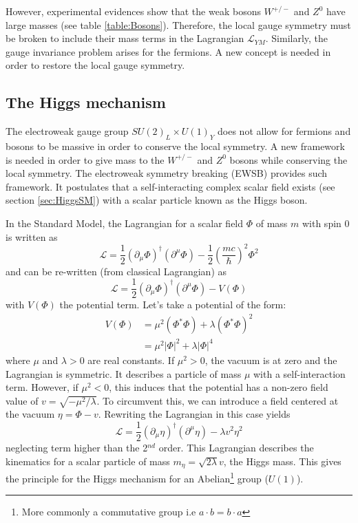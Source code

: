 However, experimental evidences \cite{Rubbia:1983pta} show that the weak bosons $W^{+/-}$ and $Z^0$ have large masses (see table \ref{table:Bosons}). Therefore, the local gauge symmetry must be broken to include their mass terms in the Lagrangian $\mathcal{L}_{YM}$. Similarly, the gauge invariance problem arises for the fermions. A new concept is needed in order to restore the local gauge symmetry.

\subsection{The Higgs mechanism}
\label{subsec:HiggsMecha}

The electroweak gauge group $SU(2)_{L} \times U(1)_{Y}$ does not allow for fermions and bosons to be massive in order to conserve the local symmetry. A new framework is needed in order to give mass to the $W^{+/-}$ and $Z^0$ bosons while conserving the local symmetry. The electroweak symmetry breaking (EWSB) provides such framework. It postulates that a self-interacting complex scalar field exists (see section \ref{sec:HiggsSM}) with a scalar particle known as the Higgs boson.

In the Standard Model, the Lagrangian for a scalar field $\Phi$ of mass $m$ with spin 0 is written as \cite{Griffiths:343277}
\begin{equation}
  \mathcal{L} = \frac{1}{2}(\partial_{\mu}\Phi)^{\dagger}(\partial^{\mu}\Phi) - \frac{1}{2}\left(\frac{mc}{\hbar}\right)^2\Phi^2
\end{equation}
and can be re-written (from classical Lagrangian) as
\begin{equation} \label{eq:HiggsLag}
  \mathcal{L} = \frac{1}{2}(\partial_{\mu}\Phi)^{\dagger}(\partial^{\mu}\Phi) - V(\Phi)
\end{equation}
with $V(\Phi)$ the potential term. Let's take a potential of the form:
\begin{equation}
  \begin{aligned}
    V(\Phi) & = \mu^2(\Phi^*\Phi) + \lambda(\Phi^*\Phi)^2 \\
    & = \mu^2|\Phi|^2 + \lambda|\Phi|^4
  \end{aligned}
\end{equation}
where $\mu$ and $\lambda > 0$ are real constants. If $\mu^2 > 0$, the vacuum is at zero and the Lagrangian is symmetric. It describes a particle of mass $\mu$ with a self-interaction term. However, if $\mu^2 < 0$, this induces that the potential has a non-zero field value of $v = \sqrt{-\mu^2/\lambda}$. To circumvent this, we can introduce a field centered at the vacuum $\eta = \Phi - v$. Rewriting the Lagrangian in this case yields
\begin{equation}
  \mathcal{L} = \frac{1}{2}(\partial_{\mu}\eta)^{\dagger}(\partial^{\mu}\eta) - \lambda v^2\eta^2
\end{equation}
neglecting term higher than the 2$^{nd}$ order. This Lagrangian describes the kinematics for a scalar particle of mass $m_{\eta} = \sqrt{2\lambda}v$, the Higgs mass. This gives the principle for the Higgs mechanism for an Abelian\footnote{More commonly a commutative group i.e $a \cdot b = b \cdot a$} group ($U(1)$).

